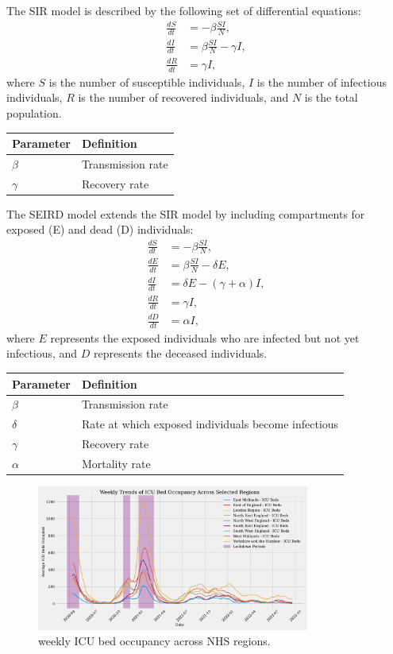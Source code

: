 \documentclass[12pt, letterpaper]{report}
\begin{document}
The SIR model is described by the following set of differential equations:
\begin{align}
\frac{dS}{dt} &= -\beta \frac{SI}{N}, \\
\frac{dI}{dt} &= \beta \frac{SI}{N} - \gamma I, \\
\frac{dR}{dt} &= \gamma I,
\end{align}
where $S$ is the number of susceptible individuals, $I$ is the number of infectious individuals, $R$ is the number of recovered individuals, and $N$ is the total population.
\begin{tabular}{ll}
\toprule
\textbf{Parameter} & \textbf{Definition} \\
\midrule
$\beta$ & Transmission rate \\
$\gamma$ & Recovery rate \\
\bottomrule
\end{tabular}
The SEIRD model extends the SIR model by including compartments for exposed (E) and dead (D) individuals:
\begin{align}
\frac{dS}{dt} &= -\beta \frac{SI}{N}, \\
\frac{dE}{dt} &= \beta \frac{SI}{N} - \delta E, \\
\frac{dI}{dt} &= \delta E - (\gamma + \alpha) I, \\
\frac{dR}{dt} &= \gamma I, \\
\frac{dD}{dt} &= \alpha I,
\end{align}
where $E$ represents the exposed individuals who are infected but not yet infectious, and $D$ represents the deceased individuals.



\begin{tabular}{ll}
\toprule
\textbf{Parameter} & \textbf{Definition} \\
\midrule
$\beta$ & Transmission rate \\
$\delta$ & Rate at which exposed individuals become infectious \\
$\gamma$ & Recovery rate \\
$\alpha$ & Mortality rate \\
\bottomrule
\end{tabular}

\begin{figure}[ht]
    \centering
    \includegraphics[width=0.8\textwidth]{"images/weekly_icu_beds_occupancy.pdf"}
    \caption{weekly ICU bed occupancy across NHS regions.}
    \label{fig:ICU_beds_occupancy}
\end{figure}
\end{document}
